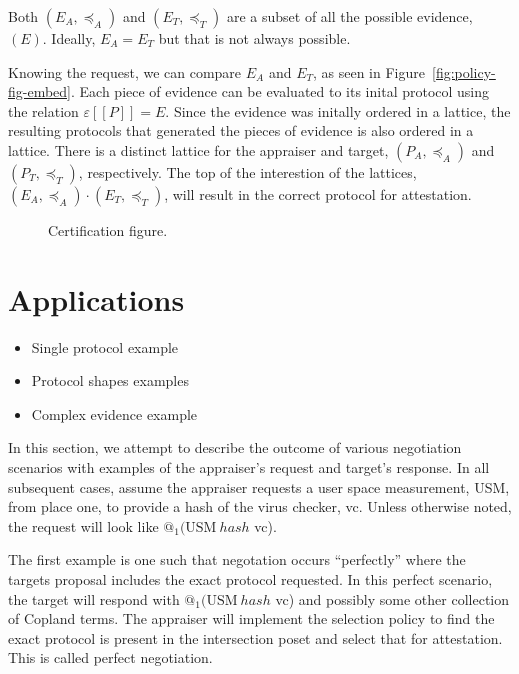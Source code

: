 \documentclass[sigconf,authordraft]{acmart}
\begin{document}
Both $(E_A,\preceq_A)$ and $(E_T,\preceq_T)$ are a subset of all the
possible evidence, $(E)$. Ideally, $E_A = E_T$ but that is not always
possible.

Knowing the request, we can compare $E_A$ and $E_T$, as seen in
Figure~\ref{fig:policy-fig-embed}. Each piece of evidence can be
evaluated to its inital protocol using the relation
$\varepsilon [\![P]\!] = E$. Since the evidence was initally ordered
in a lattice, the resulting protocols that generated the pieces of
evidence is also ordered in a lattice. There is a distinct lattice for
the appraiser and target, $(P_A,\preceq_A)$ and
$(P_T,\preceq_T)$, respectively. The top of the interestion of the lattices,
$(E_A,\preceq_A) \cdot (E_T,\preceq_T)$, will result in the correct
protocol for attestation.


\begin{figure}[hbtp]
  \centering 
  \caption[Attestation process]{Certification figure.}
  \label{fig:certification-fig}
\end{figure}

\section{Applications}

\begin{itemize}
\item Single protocol example
\item Protocol shapes examples
\item Complex evidence example

\end{itemize}

  
In this section, we attempt to describe the outcome of various
negotiation scenarios with examples of the appraiser's request and
target's response. In all subsequent cases, assume the appraiser
requests a user space measurement, USM, from place one, to provide a
hash of the virus checker, vc. Unless otherwise noted, the request
will look like $@_1 (\text{USM}\: hash$ vc).

The first example is one such that negotation occurs ``perfectly''
where the targets proposal includes the exact protocol requested. In
this \gls{perfect} scenario, the target will respond with
$@_1 (\text{USM}\: hash$ vc) and possibly some other collection of
Copland terms. The appraiser will implement the selection policy to
find the exact protocol is present in the intersection poset and
select that for attestation. This is called perfect negotiation.
\end{document}
